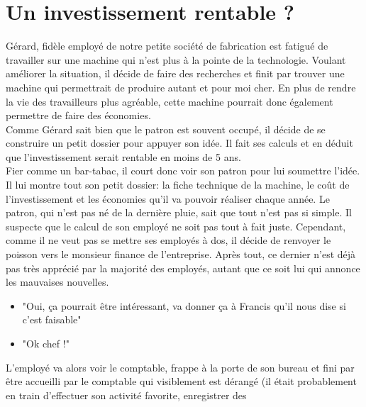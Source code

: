 
\chapter{Un investissement rentable ?}



Gérard, fidèle employé de notre petite société de
fabrication est fatigué de travailler sur une machine qui n'est 
plus à la pointe de la technologie. 
Voulant améliorer la situation, il décide de faire des 
recherches et finit par trouver une machine qui permettrait de 
produire autant et pour moi cher.
En plus de rendre la vie des travailleurs plus agréable, 
cette machine pourrait donc également permettre de faire 
des économies. \\
\hspace*{\parindent}Comme Gérard sait bien que le patron est souvent occupé, 
il décide de se construire un petit dossier pour appuyer son idée.
Il fait ses calculs et en déduit que l'investissement serait 
rentable en moins de 5 ans. \\
\hspace*{\parindent}Fier comme un bar-tabac, 
il court donc voir son patron pour lui 
soumettre l'idée. Il lui montre tout son petit dossier: la 
fiche technique de la machine, le coût de l'investissement 
et les économies qu'il va pouvoir réaliser chaque année.
Le patron, qui n'est pas né de la dernière pluie, sait que 
tout n'est pas si simple. Il suspecte que le calcul de 
son employé ne soit pas tout à fait juste. 
Cependant, comme il ne veut pas se mettre ses employés à dos, 
il décide de renvoyer le poisson vers le monsieur finance 
de l'entreprise. Après tout, ce dernier n'est déjà pas très apprécié 
par la majorité des employés, autant que ce soit lui qui 
annonce les mauvaises nouvelles.
\begin{itemize}
  \item "Oui, ça pourrait être intéressant, va donner ça à 
  Francis qu'il nous dise si c'est faisable"
  \item "Ok chef !"
\end{itemize}
\hspace*{\parindent}L'employé va alors voir le comptable, 
frappe à la porte de son bureau et fini par être accueilli par le 
comptable qui visiblement est dérangé (il était probablement 
en train d'effectuer son activité favorite, enregistrer des 
